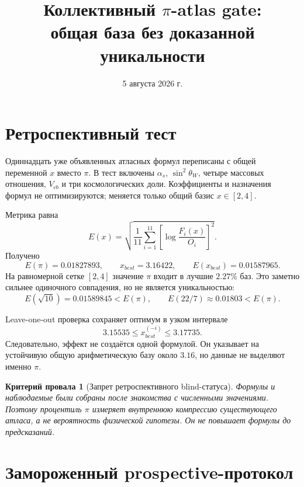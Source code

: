 \documentclass[12pt,a4paper]{article}
\title{Коллективный $\pi$-atlas gate:\\
общая база без доказанной уникальности}
\author{}
\date{5 августа 2026 г.}
\newtheorem{nogocriterion}{Критерий провала}
\begin{document}
\maketitle

\section{Ретроспективный тест}

Одиннадцать уже объявленных атласных формул переписаны с общей переменной
$x$ вместо $\pi$. В тест включены $\alpha_s$, $\sin^2\theta_W$, четыре
массовых отношения, $V_{cb}$ и три космологических доли. Коэффициенты и
назначения формул не оптимизируются; меняется только общий базис
$x\in[2,4]$.

Метрика равна
\begin{equation}
 E(x)=\sqrt{\frac1{11}\sum_{i=1}^{11}
 \left[\log\frac{F_i(x)}{O_i}\right]^2}.
\end{equation}
Получено
\begin{equation}
 E(\pi)=0.01827893,
 \qquad
 x_{best}=3.16422,
 \qquad
 E(x_{best})=0.01587965.
\end{equation}
На равномерной сетке $[2,4]$ значение $\pi$ входит в лучшие $2.27\%$ баз.
Это заметно сильнее одиночного совпадения, но не является уникальностью:
\begin{equation}
 E(\sqrt{10})=0.01589845<E(\pi),
 \qquad
 E(22/7)\approx0.01803<E(\pi).
\end{equation}

Leave-one-out проверка сохраняет оптимум в узком интервале
\begin{equation}
 3.15535\le x_{best}^{(-i)}\le3.17735.
\end{equation}
Следовательно, эффект не создаётся одной формулой. Он указывает на устойчивую
общую арифметическую базу около $3.16$, но данные не выделяют именно $\pi$.

\begin{nogocriterion}[Запрет ретроспективного blind-статуса]
Формулы и наблюдаемые были собраны после знакомства с численными значениями.
Поэтому процентиль $\pi$ измеряет внутреннюю компрессию существующего атласа,
а не вероятность физической гипотезы. Он не повышает формулы до предсказаний.
\end{nogocriterion}

\section{Замороженный prospective-протокол}
\end{document}
